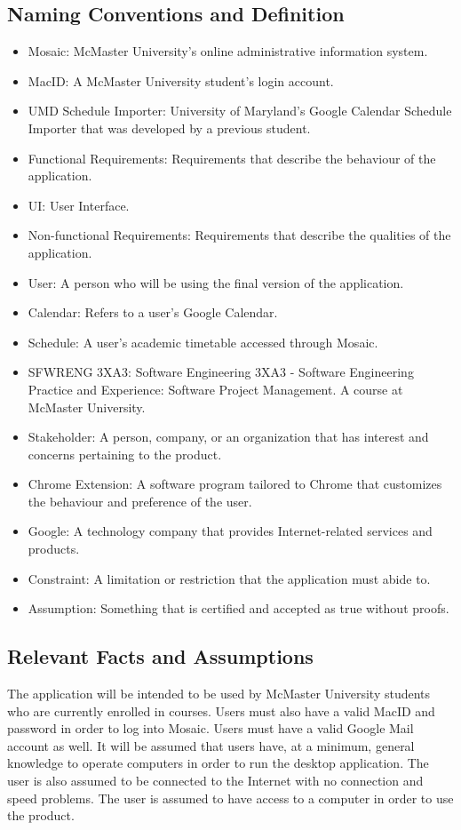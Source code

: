 \documentclass[12pt, titlepage]{article}
\begin{document}
\subsection{Naming Conventions and Definition}
\begin{itemize}
\item Mosaic: McMaster University's online administrative information system.
\item MacID: A McMaster University student's login account.
\item UMD Schedule Importer:  University of Maryland's Google Calendar Schedule Importer that was developed by a previous student.
\item Functional Requirements: Requirements that describe the behaviour of the application.
\item UI: User Interface.
\item Non-functional Requirements: Requirements that describe the qualities of the application.
\item User: A person who will be using the final version of the application. 
\item Calendar: Refers to a user's Google Calendar.
\item Schedule: A user's academic timetable accessed through Mosaic.
\item SFWRENG 3XA3: Software Engineering 3XA3 - Software Engineering Practice and Experience: Software Project Management. A course at McMaster University.
\color{blue}
\item Stakeholder: A person, company, or an organization that has interest and concerns pertaining to the product.
\item Chrome Extension: A software program tailored to Chrome that customizes the behaviour and preference of the user.
\item Google: A technology company that provides Internet-related services and products.
\item Constraint: A limitation or restriction that the application must abide to.
\item Assumption: Something that is certified and accepted as true without proofs.
\color{black}
\end{itemize}
\subsection{Relevant Facts and Assumptions}

\hspace{5mm}The application will be intended to be used by McMaster University students who are currently enrolled in courses. Users must also have a valid MacID and password in order to log into Mosaic. Users must have a valid Google Mail account as well. It will be assumed that users have, at a minimum, general knowledge to operate computers in order to run the desktop application. 
\color{blue}
The user is also assumed to be connected to the Internet with no connection and speed problems. The user is assumed to have access to a computer in order to use the product. 
\color{black}
\end{document}
